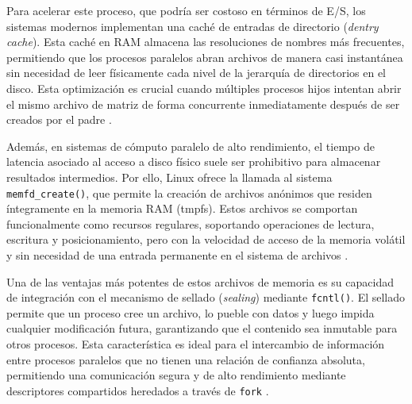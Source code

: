 Para acelerar este proceso, que podría ser costoso en términos de E/S, los sistemas modernos implementan una caché de entradas de directorio (\textit{dentry cache}). Esta caché en RAM almacena las resoluciones de nombres más frecuentes, permitiendo que los procesos paralelos abran archivos de manera casi instantánea sin necesidad de leer físicamente cada nivel de la jerarquía de directorios en el disco. Esta optimización es crucial cuando múltiples procesos hijos intentan abrir el mismo archivo de matriz de forma concurrente inmediatamente después de ser creados por el padre \cite{glibc_manual}.



Además, en sistemas de cómputo paralelo de alto rendimiento, el tiempo de latencia asociado al acceso a disco físico suele ser prohibitivo para almacenar resultados 
intermedios. Por ello, Linux ofrece la llamada al sistema \texttt{memfd\_create()}, que permite la creación de archivos anónimos que residen 
íntegramente en la memoria RAM (tmpfs). Estos archivos se comportan funcionalmente como recursos regulares, soportando operaciones de lectura, escritura y 
posicionamiento, pero con la velocidad de acceso de la memoria volátil y sin necesidad de una entrada permanente en el sistema de archivos \cite{mit_6828, linux_man}.

Una de las ventajas más potentes de estos archivos de memoria es su capacidad de integración con el mecanismo de sellado (\textit{sealing}) mediante 
\texttt{fcntl()}. El sellado permite que un proceso cree un archivo, lo pueble con datos y luego impida cualquier modificación futura, garantizando 
que el contenido sea inmutable para otros procesos. Esta característica es ideal para el intercambio de información entre procesos paralelos que no 
tienen una relación de confianza absoluta, permitiendo una comunicación segura y de alto rendimiento mediante descriptores compartidos heredados a 
través de \texttt{fork} \cite{linux_man, glibc_manual}.